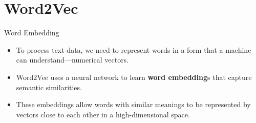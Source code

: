 \documentclass[serif, aspectratio=169]{beamer}
\begin{document}
%
%
%
%





\section{Word2Vec}

\begin{frame}{Word Embedding} 
	
	\begin{itemize} \item To process text data, we need to represent words in a form that a machine can understand—numerical vectors. \item Word2Vec uses a neural network to learn \textbf{word embedding}s that capture semantic similarities. \item These embeddings allow words with similar meanings to be represented by vectors close to each other in a high-dimensional space. 
	\end{itemize} 
\end{frame}
\end{document}

